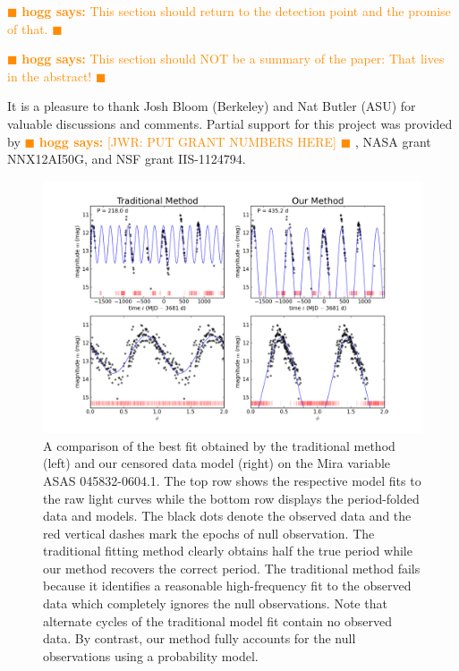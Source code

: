 \documentclass[12pt,preprint]{aastex}
\newcommand{\hogg}[1] { \textcolor{darkorange} {
\ensuremath{\blacksquare} {\bf hogg says:}  {#1}
\ensuremath{\blacksquare} } }
\begin{document}
\hogg{This section should return to the detection point and the promise of that.}

\hogg{This section should NOT be a summary of the paper:  That lives in the abstract!}


\acknowledgements It is a pleasure to thank
%
  Josh Bloom (Berkeley) and
  Nat Butler (ASU)
%
for valuable discussions and comments.
%
Partial support for this project was provided by \hogg{[JWR: PUT GRANT
  NUMBERS HERE]}, NASA grant NNX12AI50G, and NSF grant IIS-1124794.



\clearpage
\begin{figure}
  \begin{center}
\includegraphics[angle=0,width=6.5in]{fig_045832-0604_1.png}
  \end{center}
  \caption{A comparison of the best fit obtained by the traditional method (left) and our censored data model (right) on the Mira variable ASAS 045832-0604.1.  The top row shows the respective model fits to the raw light curves while the bottom row displays the period-folded data and models.  The black dots denote the observed data and the red vertical dashes mark the epochs of null observation.  The traditional fitting method clearly obtains half the true period while our method recovers the correct period.  The traditional method fails because it identifies a reasonable high-frequency fit to the observed data which completely ignores the null observations.  Note that alternate cycles of the traditional model fit contain no observed data.  By contrast, our method fully accounts for the null observations using a probability model.\label{fig:badfit}}
\end{figure}
\end{document}
